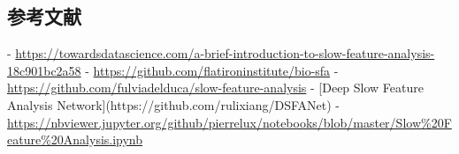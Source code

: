 \subsection{参考文献}- \url{https://towardsdatascience.com/a-brief-introduction-to-slow-feature-analysis-18c901bc2a58}
- \url{https://github.com/flatironinstitute/bio-sfa}
- \url{https://github.com/fulviadelduca/slow-feature-analysis}
- [Deep Slow Feature Analysis Network](https://github.com/rulixiang/DSFANet)
- \url{https://nbviewer.jupyter.org/github/pierrelux/notebooks/blob/master/Slow%20Feature%20Analysis.ipynb}